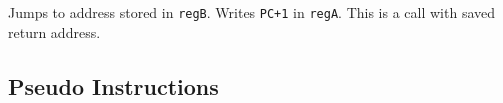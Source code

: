 \documentclass[10pt,a4paper]{article}
\theoremstyle{definition}%
\newcommand{\reg}[1]{\texttt{reg#1}}
\begin{document}
Jumps to address stored in \reg{B}. Writes \verb!PC+1! in \reg{A}. This is a call with saved return address.
%

%
%
%
%
%
%
%
%
%
%
%
%
%

\subsection{Pseudo Instructions}
\end{document}
